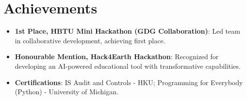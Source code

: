 \documentclass[letterpaper,11pt]{article}
\newcommand{\resumeItem}[2]{
  \item\small{
    \textbf{#1}{: #2 \vspace{-2pt}}
  }
}
\newcommand{\resumeSubHeadingListStart}{\begin{itemize}[leftmargin=*]}
\newcommand{\resumeSubHeadingListEnd}{\end{itemize}}
\begin{document}
\section{Achievements}
 \resumeSubHeadingListStart
    \resumeItem{1st Place, HBTU Mini Hackathon (GDG Collaboration)}{Led team in collaborative development, achieving first place.}
    \resumeItem{Honourable Mention, Hack4Earth Hackathon}{Recognized for developing an AI-powered educational tool with transformative capabilities.}
    \resumeItem{Certifications}{IS Audit and Controls - HKU; Programming for Everybody (Python) - University of Michigan.}
 \resumeSubHeadingListEnd
\end{document}
